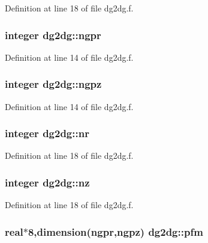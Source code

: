 Definition at line 18 of file dg2dg.f.\hypertarget{namespacedg2dg_e9a7ecb72eab0642c64a97ca91c13b0a}{
\subsubsection[ngpr]{\setlength{\rightskip}{0pt plus 5cm}integer {\bf dg2dg::ngpr}}}
\label{namespacedg2dg_e9a7ecb72eab0642c64a97ca91c13b0a}




Definition at line 14 of file dg2dg.f.\hypertarget{namespacedg2dg_e7dd506213bbb6cba705ecab71df0a94}{
\subsubsection[ngpz]{\setlength{\rightskip}{0pt plus 5cm}integer {\bf dg2dg::ngpz}}}
\label{namespacedg2dg_e7dd506213bbb6cba705ecab71df0a94}




Definition at line 14 of file dg2dg.f.\hypertarget{namespacedg2dg_b3df22b96364892fd08e20a2d00bc877}{
\subsubsection[nr]{\setlength{\rightskip}{0pt plus 5cm}integer {\bf dg2dg::nr}}}
\label{namespacedg2dg_b3df22b96364892fd08e20a2d00bc877}




Definition at line 18 of file dg2dg.f.\hypertarget{namespacedg2dg_d946d8fc014faceab571c2af730bc414}{
\subsubsection[nz]{\setlength{\rightskip}{0pt plus 5cm}integer {\bf dg2dg::nz}}}
\label{namespacedg2dg_d946d8fc014faceab571c2af730bc414}




Definition at line 18 of file dg2dg.f.\hypertarget{namespacedg2dg_401e9ba4eb2cfdba5f316ce35f5d2dd4}{
\subsubsection[pfm]{\setlength{\rightskip}{0pt plus 5cm}real$\ast$8,dimension({\bf ngpr},{\bf ngpz}) {\bf dg2dg::pfm}}}
\label{namespacedg2dg_401e9ba4eb2cfdba5f316ce35f5d2dd4}




